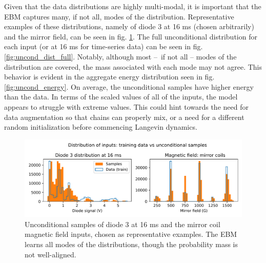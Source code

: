 Given that the data distributions are highly multi-modal, it is important that the EBM captures many, if not all, modes of the distribution. Representative examples of these distributions, namely of diode 3 at 16 ms (chosen arbitrarily) and the mirror field, can be seen in fig. \ref{fig:uncond_examples}. The full unconditional distribution for each input (or at 16 ms for time-series data) can be seen in fig. \ref{fig:uncond_dist_full}. Notably, although most -- if not all -- modes of the distribution are covered, the mass associated with each mode may not agree. This behavior is evident in the aggregate energy distribution seen in fig. \ref{fig:uncond_energy}. On average, the unconditional samples have higher energy than the data. In terms of the scaled values of all of the inputs, the model appears to struggle with extreme values. This could hint towards the need for data augmentation so that chains can properly mix, or a need for a different random initialization before commencing Langevin dynamics.

\begin{figure}
	\centering
	\includegraphics[width=\linewidth]{figures/uncond_diode-3_B-mirror_39-0.pdf}
	\caption[Unconditional samples -- diode 3 and mirror field]{\label{fig:uncond_examples}Unconditional samples of diode 3 at 16 ms and the mirror coil magnetic field inputs, chosen as representative examples. The EBM learns all modes of the distributions, though the probability mass is not well-aligned.}
\end{figure}

